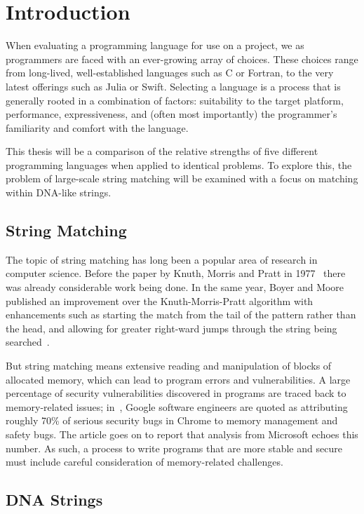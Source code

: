 \section{Introduction}
\label{sec:introduction}

When evaluating a programming language for use on a project, we as programmers are faced with an ever-growing array of choices. These choices range from long-lived, well-established languages such as C or Fortran, to the very latest offerings such as Julia or Swift. Selecting a language is a process that is generally rooted in a combination of factors: suitability to the target platform, performance, expressiveness, and (often most importantly) the programmer's familiarity and comfort with the language.

This thesis will be a comparison of the relative strengths of five different programming languages when applied to identical problems. To explore this, the problem of large-scale string matching will be examined with a focus on matching within DNA-like strings.

\subsection{String Matching}

The topic of string matching has long been a popular area of research in computer science. Before the paper by Knuth, Morris and Pratt in 1977~\cite{knuth.morris.pratt.1977} there was already considerable work being done. In the same year, Boyer and Moore published an improvement over the Knuth-Morris-Pratt algorithm with enhancements such as starting the match from the tail of the pattern rather than the head, and allowing for greater right-ward jumps through the string being searched~\cite{boyer.moore.1977}.

But string matching means extensive reading and manipulation of blocks of allocated memory, which can lead to program errors and vulnerabilities. A large percentage of security vulnerabilities discovered in programs are traced back to memory-related issues; in~\cite{cimpanu.2020}, Google software engineers are quoted as attributing roughly 70\% of serious security bugs in Chrome to memory management and safety bugs. The article goes on to report that analysis from Microsoft echoes this number. As such, a process to write programs that are more stable and secure must include careful consideration of memory-related challenges.

\subsection{DNA Strings}

